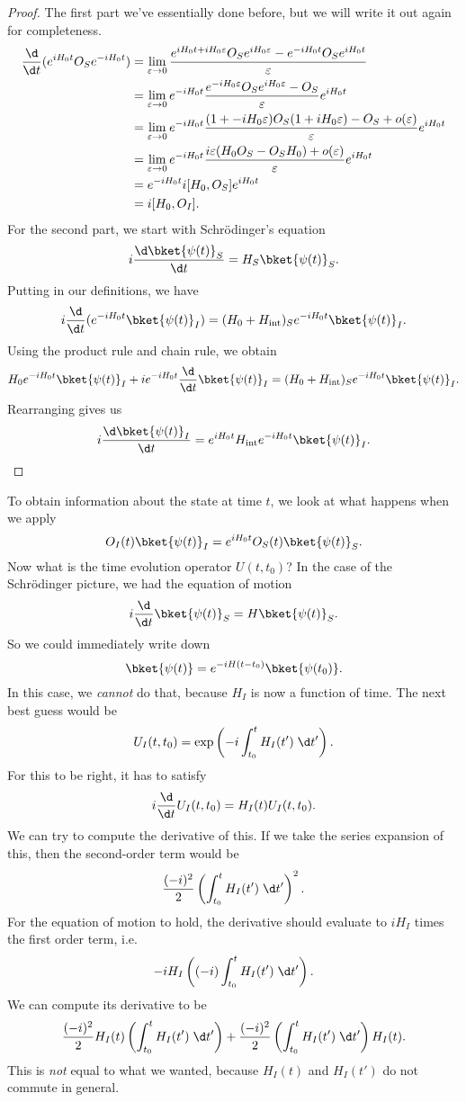 \documentclass[a4paper]{article}
\begin{document}
\begin{proof}
  The first part we've essentially done before, but we will write it out again for completeness.
  \begin{align*}
    \frac{\d}{\d t} (e^{iH_0 t}O_S e^{-iH_0 t}) &= \lim_{\varepsilon \to 0} \frac{e^{iH_0t + iH_0 \varepsilon} O_S e^{iH_0 \varepsilon} - e^{-iH_0 t}O_Se^{iH_0 t}}{\varepsilon}\\
    &= \lim_{\varepsilon \to 0} e^{-iH_0 t}\frac{e^{-iH_0 \varepsilon}O_S e^{iH_0 \varepsilon}- O_S}{\varepsilon} e^{iH_0 t}\\
    &= \lim_{\varepsilon \to 0} e^{-iH_0 t}\frac{(1 + -iH_0 \varepsilon)O_S(1 + iH_0 \varepsilon) - O_S + o(\varepsilon)}{\varepsilon} e^{iH_0 t}\\
    &= \lim_{\varepsilon \to 0} e^{-iH_0 t} \frac{i\varepsilon (H_0 O_S - O_SH_0 ) + o(\varepsilon)}{\varepsilon}e^{iH_0 t}\\
    &= e^{-iH_0 t}i [H_0 , O_S] e^{iH_0 t}\\
    &= i [H_0, O_I].
  \end{align*}
  For the second part, we start with Schr\"odinger's equation
  \[
    i \frac{\d \bket{\psi(t)}_S}{\d t} = H_S \bket{\psi(t)}_S.
  \]
  Putting in our definitions, we have
  \[
    i \frac{\d}{\d t}(e^{-iH_0 t}\bket{\psi(t)}_I) = (H_0 + H_{\mathrm{int}})_S e^{-iH_0 t} \bket{\psi(t)}_I.
  \]
  Using the product rule and chain rule, we obtain
  \[
    H_0 e^{-iH_0 t}\bket{\psi(t)}_I + ie^{-iH_0t}\frac{\d}{\d t}\bket{\psi(t)}_I = (H_0 + H_{\mathrm{int}})_S e^{-iH_0 t} \bket{\psi(t)}_I.
  \]
  Rearranging gives us
  \[
    i \frac{\d \bket{\psi(t)}_I}{\d t} = e^{iH_0 t} H_{\mathrm{int}} e^{-iH_0 t} \bket{\psi(t)}_I.
  \]
\end{proof}
To obtain information about the state at time $t$, we look at what happens when we apply
\[
  O_I(t) \bket{\psi(t)}_I = e^{iH_0t}O_S(t) \bket{\psi(t)}_S.
\]
Now what is the time evolution operator $U(t, t_0)$? In the case of the Schr\"odinger picture, we had the equation of motion
\[
  i\frac{\d}{\d t}\bket{\psi(t)}_S = H\bket{\psi(t)}_S.
\]
So we could immediately write down
\[
  \bket{\psi(t)} = e^{-iH(t - t_0)} \bket{\psi(t_0)}.
\]
In this case, we \emph{cannot} do that, because $H_I$ is now a function of time. The next best guess would be
\[
  U_I(t, t_0) = \exp\left(-i \int_{t_0}^t H_I(t') \;\d t'\right).
\]
For this to be right, it has to satisfy
\[
  i\frac{\d}{\d t}U_I(t, t_0) = H_I(t) U_I(t, t_0).
\]
We can try to compute the derivative of this. If we take the series expansion of this, then the second-order term would be
\[
  \frac{(-i)^2}{2} \left(\int_{t_0}^t H_I(t') \;\d t'\right)^2.
\]
For the equation of motion to hold, the derivative should evaluate to $iH_I$ times the first order term, i.e.
\[
  -i H_I \left( (-i)\int_{t_0}^t H_I(t')\;\d t'\right).
\]
We can compute its derivative to be
\[
  \frac{(-i)^2}{2} H_I(t) \left(\int_{t_0}^t H_I(t')\;\d t'\right) + \frac{(-i)^2}{2} \left(\int_{t_0}^t H_I(t') \;\d t'\right) H_I(t) .
\]
This is \emph{not} equal to what we wanted, because $H_I(t)$ and $H_I(t')$ do not commute in general.
\end{document}
